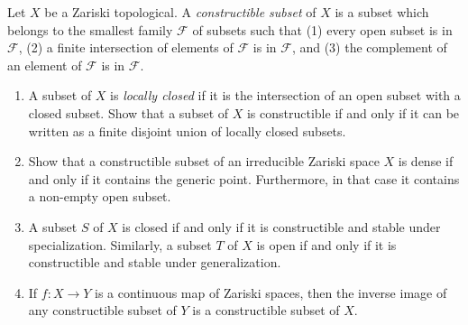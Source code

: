 \begin{exercise}
	Let $X$ be a Zariski topological. A \textit{constructible subset} of $X$ is a subset which belongs to the smallest family $\mathcal{F}$ of subsets such that (1) every open subset is in $\mathcal{F}$, (2) a finite intersection of elements of $\mathcal{F}$ is in $\mathcal{F}$, and (3) the complement of an element of $\mathcal{F}$ is in $\mathcal{F}$.
	\begin{enumerate}
		\item A subset of $X$ is \textit{locally closed} if it is the intersection of an open subset with a closed subset. Show that a subset of $X$ is constructible if and only if it can be written as a finite disjoint union of locally closed subsets.
		\item Show that a constructible subset of an irreducible Zariski space $X$ is dense if and only if it contains the generic point. Furthermore, in that case it contains a non-empty open subset.
		\item A subset $S $ of $X $ is closed if and only if it is constructible and stable under specialization. Similarly, a subset $T $ of $X $ is open if and only if it is constructible and stable under generalization.
		\item If $f:X \to Y$ is a continuous map of Zariski spaces, then the inverse image of any constructible subset of $Y$ is a constructible subset of $X$.
	\end{enumerate}
\end{exercise}
